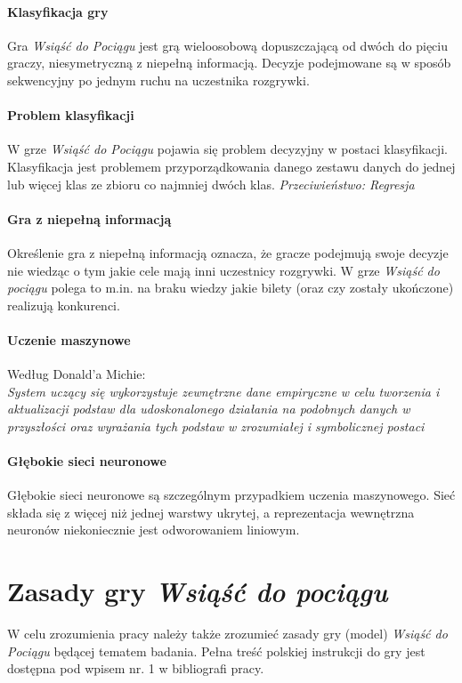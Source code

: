 \documentclass[12pt, oneside]{report}
\begin{document}
\paragraph{Klasyfikacja gry}
Gra \textit{Wsiąść do Pociągu} jest grą wieloosobową dopuszczającą od dwóch do pięciu graczy, niesymetryczną z niepełną informacją. Decyzje podejmowane są w sposób sekwencyjny po jednym ruchu na uczestnika rozgrywki.
\paragraph{Problem klasyfikacji}
W grze \textit{Wsiąść do Pociągu} pojawia się problem decyzyjny w postaci klasyfikacji. Klasyfikacja jest problemem przyporządkowania danego zestawu danych do jednej lub więcej klas ze zbioru co najmniej dwóch klas. \textit{Przeciwieństwo: Regresja}
\paragraph{Gra z niepełną informacją} 
Określenie gra z niepełną informacją oznacza, że gracze podejmują swoje decyzje nie wiedząc o tym jakie cele mają inni uczestnicy rozgrywki. W grze \textit{Wsiąść do pociągu} polega to m.in. na braku wiedzy jakie bilety (oraz czy zostały ukończone) realizują konkurenci.
\paragraph{Uczenie maszynowe}
Według Donald'a Michie: \\ \textit{System uczący się wykorzystuje zewnętrzne dane empiryczne w celu tworzenia i aktualizacji podstaw dla udoskonalonego działania na podobnych danych w przyszłości oraz wyrażania tych podstaw w zrozumiałej i symbolicznej postaci}
\paragraph{Głębokie sieci neuronowe}
Głębokie sieci neuronowe są szczególnym przypadkiem uczenia maszynowego. Sieć składa się z więcej niż jednej warstwy ukrytej, a reprezentacja wewnętrzna neuronów niekoniecznie jest odworowaniem liniowym.
\section{Zasady gry \textit{Wsiąść do pociągu}}
W celu zrozumienia pracy należy także zrozumieć zasady gry (model) \textit{Wsiąść do Pociągu} będącej tematem badania. Pełna treść polskiej instrukcji do gry jest dostępna pod wpisem nr. 1 w bibliografi pracy.
\end{document}
